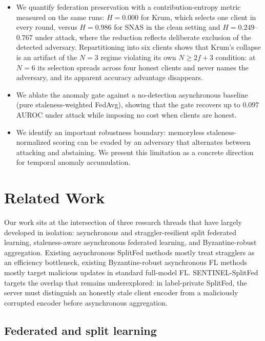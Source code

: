 \documentclass[pdflatex,sn-mathphys-num]{sn-jnl}
\begin{document}
\begin{itemize}
    \item We quantify federation preservation with a contribution-entropy metric measured on the same runs: $H=0.000$ for Krum, which selects one client in every round, versus $H=0.986$ for SNAS in the clean setting and $H=0.249$--$0.767$ under attack, where the reduction reflects deliberate exclusion of the detected adversary. Repartitioning into six clients shows that Krum's collapse is an artifact of the $N=3$ regime violating its own $N\geq2f+3$ condition: at $N=6$ its selection spreads across four honest clients and never names the adversary, and its apparent accuracy advantage disappears.
    \item We ablate the anomaly gate against a no-detection asynchronous baseline (pure staleness-weighted FedAvg), showing that the gate recovers up to $0.097$ AUROC under attack while imposing no cost when clients are honest.
    \item We identify an important robustness boundary: memoryless staleness-normalized scoring can be evaded by an adversary that alternates between attacking and abstaining. We present this limitation as a concrete direction for temporal anomaly accumulation.
\end{itemize}

\section{Related Work}\label{sec:related}

Our work sits at the intersection of three research threads that have largely developed in isolation: asynchronous and straggler-resilient split federated learning, staleness-aware asynchronous federated learning, and Byzantine-robust aggregation. Existing asynchronous SplitFed methods mostly treat stragglers as an efficiency bottleneck, existing Byzantine-robust asynchronous FL methods mostly target malicious updates in standard full-model FL. SENTINEL-SplitFed targets the overlap that remains underexplored: in label-private SplitFed, the server must distinguish an honestly stale client encoder from a maliciously corrupted encoder before asynchronous aggregation.

\subsection{Federated and split learning}
\end{document}
